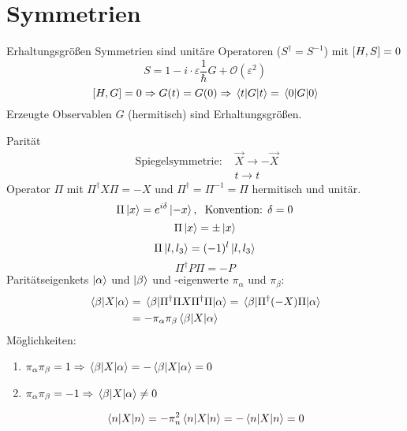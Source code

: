 \section{Symmetrien}

\begin{subbox}{Erhaltungsgrößen}
Symmetrien sind unitäre Operatoren ($S^\dag = S^{-1}$) mit $\comm{H}{S} =0$
\[ S = 1 -i \cdot \varepsilon \frac{1}{\hbar} G + \mathcal{O}(\varepsilon^2) \]
\[ \comm{H}{G} = 0 \Rightarrow G(t) = G(0) \Rightarrow \expval{G}{t} = \expval{G}{0} \]
Erzeugte Observablen $G$ (hermitisch) sind Erhaltungsgrößen.
\end{subbox}


\begin{mainbox}{Parität}
\begin{align*}
    \text{ Spiegelsymmetrie: } & \vec{X} \rightarrow -\vec{X} \\
    & t \rightarrow t
\end{align*}
Operator $\Pi$ mit $\Pi^\dag X \Pi = -X$ und $\Pi^\dag = \Pi^{-1} = \Pi$ hermitisch und unitär.
\[ \Pi \ket{x} = e^{i\delta} \ket{-x}, \hspace{.2cm} \text{Konvention: } \delta = 0 \]
\[ \Pi \ket{x} = \pm \ket{x} \]
\[ \Pi \ket{l, l_3} = (-1)^l \ket{l, l_3} \]
\[ \Pi^\dag P \Pi = -P \]
Paritätseigenkets $\ket{\alpha}$ und $\ket{\beta}$ und -eigenwerte $\pi_\alpha$ und $\pi_\beta$:
\begin{align*}
\mel{\beta}{X}{\alpha} &= \mel{\beta}{\Pi^\dag \Pi X \Pi^\dag \Pi}{\alpha} = \mel{\beta}{\Pi^\dag (-X) \Pi}{\alpha} \\
 & = - \pi_\alpha \pi_\beta \mel{\beta}{X}{\alpha}
\end{align*}
Möglichkeiten:
\begin{enumerate}
    \item \(\pi_\alpha \pi_\beta = 1 \Rightarrow \mel{\beta}{X}{\alpha} = - \mel{\beta}{X}{\alpha} = 0 \)
    \item \(\pi_\alpha \pi_\beta = -1 \Rightarrow \mel{\beta}{X}{\alpha} \neq 0 \)
\end{enumerate}
\[ \expval{X}{n} = - \pi_n^2 \expval{X}{n} = - \expval{X}{n} = 0 \]
\end{mainbox}


